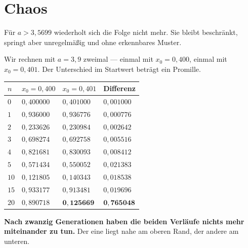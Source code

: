 \section{Chaos}

\begin{merksatz}
Für $a > 3{,}5699$ wiederholt sich die Folge nicht mehr. Sie bleibt beschränkt, springt aber unregelmäßig und ohne erkennbares Muster.

Wir rechnen mit $a = 3{,}9$ zweimal --- einmal mit $x_0 = 0{,}400$, einmal mit $x_0 = 0{,}401$. Der Unterschied im Startwert beträgt ein Promille.

\begin{center}
{\small
\renewcommand{\arraystretch}{1.4}
\begin{tabular}{@{}P{1.0cm}P{2.0cm}P{2.0cm}P{2.0cm}@{}}
\toprule
$n$ & $x_0 = 0{,}400$ & $x_0 = 0{,}401$ & \textbf{Differenz}\\
\midrule
$0$ & $0{,}400000$ & $0{,}401000$ & $0{,}001000$\\
$1$ & $0{,}936000$ & $0{,}936776$ & $0{,}000776$\\
$2$ & $0{,}233626$ & $0{,}230984$ & $0{,}002642$\\
$3$ & $0{,}698274$ & $0{,}692758$ & $0{,}005516$\\
$4$ & $0{,}821681$ & $0{,}830093$ & $0{,}008412$\\
$5$ & $0{,}571434$ & $0{,}550052$ & $0{,}021383$\\
$10$ & $0{,}121805$ & $0{,}140343$ & $0{,}018538$\\
$15$ & $0{,}933177$ & $0{,}913481$ & $0{,}019696$\\
$20$ & $0{,}890718$ & $\mathbf{0{,}125669}$ & \textcolor{akzent}{$\mathbf{0{,}765048}$}\\
\bottomrule
\end{tabular}}
\end{center}

\begin{center}
\begin{minipage}{0.9\textwidth}
\textbf{Nach zwanzig Generationen haben die beiden Verläufe nichts mehr miteinander zu tun.} Der eine liegt nahe am oberen Rand, der andere am unteren.
\end{minipage}
\end{center}
\end{merksatz}


